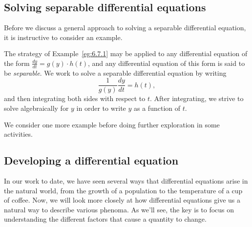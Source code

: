 
\subsection*{Solving separable differential equations} 

Before we discuss a general approach to solving a separable differential equation, it is instructive to consider an example.


The strategy of Example~\ref{eg:6.7.1} may be applied to any differential equation of the form $\frac{dy}{dt} = g(y) \cdot h(t)$, and any differential equation of this form is said to be \emph{separable}.  We work to solve a separable differential equation by writing
$$\frac{1}{g(y)} \frac{dy}{dt} = h(t),$$ 
and then integrating both sides with respect to $t$.  After integrating, we strive to solve algebraically for $y$ in order to write $y$ as a function of $t$.

We consider one more example before doing further exploration in some activities.






\subsection*{Developing a differential equation}

In our work to date, we have seen several ways that
differential equations arise in the natural world, from the growth of
a population to the temperature of a cup of coffee.  Now,
we will look more closely at how differential equations give us a
natural way to describe various phenoma.  As we'll see, the key is to
focus on understanding the different factors that cause a quantity to
change.


